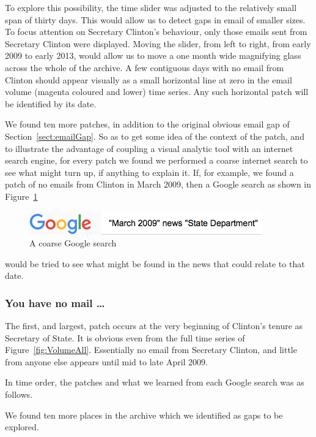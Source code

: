\documentclass[journal]{vgtc}                %
\begin{document}
To explore this possibility,  the time slider was adjusted to the relatively small span of thirty days.  This would allow us to detect gaps in email of smaller sizes.  To focus attention on Secretary Clinton's behaviour, only those emails sent from Secretary Clinton were displayed.  
Moving the slider, from left to right, from early 2009 to early 2013, would allow us to move a one month wide magnifying glass across the whole of the archive.  A few contiguous days with no email from Clinton should appear visually as a small horizontal line at zero in the email volume (magenta coloured and lower) time series.  Any such horizontal patch will be identified by its date. 

We found ten more patches, in addition to the original obvious email gap of Section~\ref{sect:emailGap}.  So as to get some idea of the context of the patch, and to illustrate the advantage of coupling a visual analytic tool with an internet search engine, for every patch we found we performed a coarse internet search to see what might turn up, if anything to explain it.  If, for example, we found a patch of no emails from Clinton in March 2009, then a Google search as shown in Figure~\ref{fig:googleSearch}
\begin{figure}[h]
\begin{center}
\includegraphics[width=0.75\linewidth]{googleSearch}
\caption{A coarse Google search}
\label{fig:googleSearch}
\end{center}
\end{figure}
would be tried to see what might be found in the news that could relate to that date.

\subsubsection{You have no mail \ldots}
The first, and largest, patch occurs at the very beginning of Clinton's tenure as Secretary of State.  It is  obvious even from the full time series of Figure~\ref{fig:VolumeAll}.  Essentially no email from Secretary Clinton, and little from anyone else appears until mid to late April 2009.

In time order, the patches and what we learned from each Google search was as follows.

We found ten more places in the archive which we identified as gaps to be explored.  
\end{document}
